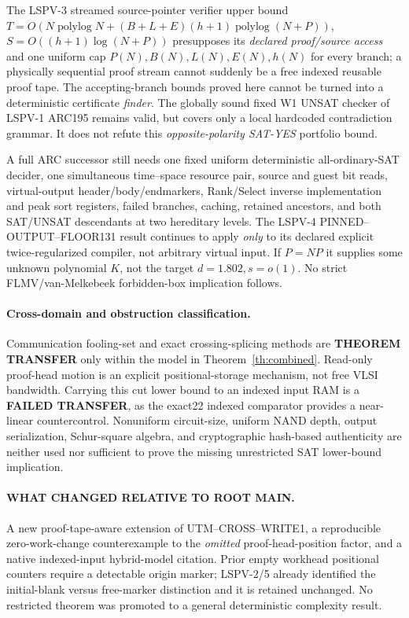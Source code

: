 \documentclass[11pt]{article}
\begin{document}
The LSPV-3 streamed source-pointer verifier upper bound
$T=O(N\operatorname{polylog}N+
(B+L+E)(h+1)\operatorname{polylog}(N+P))$,
$S=O((h+1)\log(N+P))$
presupposes its \emph{declared proof/source access}
and one uniform cap $P(N),B(N),L(N),E(N),h(N)$
for every branch; a physically sequential proof stream
cannot suddenly be a free indexed reusable proof tape.
The accepting-branch bounds proved here cannot be
turned into a deterministic certificate \emph{finder}.
The globally sound fixed W1 UNSAT checker of
LSPV-1 ARC195 remains valid, but covers only a local
hardcoded contradiction grammar. It does not refute
this \emph{opposite-polarity SAT-YES} portfolio bound.

A full ARC successor still needs one fixed uniform
deterministic all-ordinary-SAT decider, one simultaneous
time--space resource pair, source and guest bit
reads, virtual-output header/body/endmarkers,
Rank/Select inverse implementation and peak sort
registers, failed branches, caching, retained ancestors,
and both SAT/UNSAT descendants at two hereditary levels.
The LSPV-4 PINNED--OUTPUT--FLOOR131 result
continues to apply \emph{only} to its declared explicit
twice-regularized compiler, not arbitrary virtual input.
If $P=NP$ it supplies some unknown polynomial $K$,
not the target $d=1.802,s=o(1)$.
No strict FLMV/van-Melkebeek forbidden-box implication follows.

\paragraph{Cross-domain and obstruction classification.}
Communication fooling-set and exact crossing-splicing methods
are \textbf{THEOREM TRANSFER} only within the model in
Theorem~\ref{th:combined}. Read-only proof-head motion is
an explicit positional-storage mechanism, not free VLSI
bandwidth. Carrying this cut lower bound to an indexed
input RAM is a \textbf{FAILED TRANSFER}, as the
exact22 indexed comparator provides a near-linear
countercontrol. Nonuniform circuit-size, uniform NAND
depth, output serialization, Schur-square algebra, and
cryptographic hash-based authenticity are neither
used nor sufficient to prove the missing unrestricted
SAT lower-bound implication.

\paragraph{WHAT CHANGED RELATIVE TO ROOT MAIN.}
A new proof-tape-aware extension of UTM--CROSS--WRITE1,
a reproducible zero-work-change counterexample to
the \emph{omitted} proof-head-position factor, and a native
indexed-input hybrid-model citation. Prior empty
workhead positional counters require a detectable
origin marker; LSPV-2/5 already identified the
initial-blank versus free-marker distinction and
it is retained unchanged. No restricted theorem was
promoted to a general deterministic complexity result.
\end{document}
